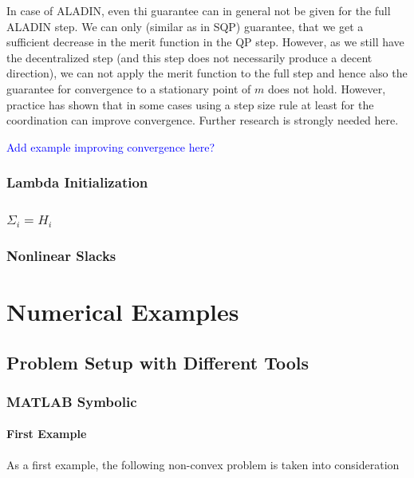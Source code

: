 \documentclass[]{scrartcl}
\begin{document}
In case of ALADIN, even thi guarantee can in general not be given for the full ALADIN step.
We can only (similar as in SQP) guarantee, that we get a sufficient decrease in the merit function in the QP step.
However, as we still have the decentralized step (and this step does not necessarily produce a decent direction), we can not apply the merit function to the full step and hence also the guarantee for convergence to a stationary point of $m$ does not hold. 
However, practice has shown that in some cases using a step size rule at least for the coordination can improve convergence.
Further research is strongly needed here. 

\textcolor{blue}{Add example improving convergence here?}

\subsubsection{Lambda Initialization}
\subsubsection{$\Sigma_i=H_i$}
\subsubsection{Nonlinear Slacks}



\section{Numerical Examples}
\subsection{Problem Setup with Different Tools}
\subsubsection{MATLAB Symbolic}
\paragraph{First Example} 
As a first example, the following non-convex problem is taken into consideration
\end{document}
